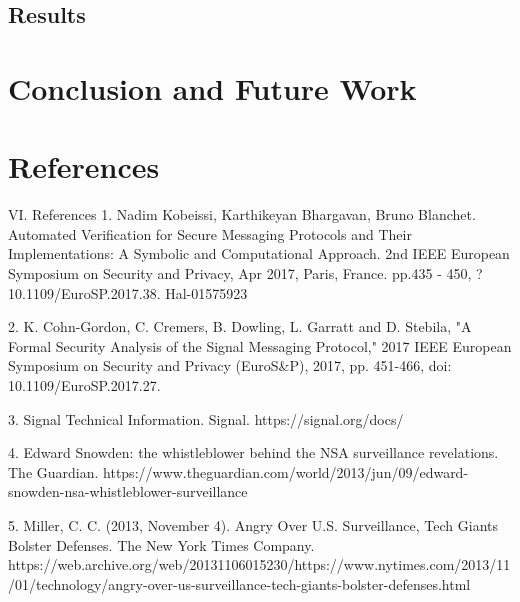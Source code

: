 \documentclass[12pt]{article}
\begin{document}
\subsection{Results}
\par %

\section{Conclusion and Future Work}
\par %





\newpage
\section{References}
VI. References
1. Nadim Kobeissi, Karthikeyan Bhargavan, Bruno Blanchet. Automated Verification for Secure Messaging Protocols and Their Implementations: A Symbolic and Computational Approach. 2nd IEEE European Symposium on Security and Privacy, Apr 2017, Paris, France. pp.435 - 450, ?10.1109/EuroSP.2017.38. Hal-01575923

2. K. Cohn-Gordon, C. Cremers, B. Dowling, L. Garratt and D. Stebila, "A Formal Security Analysis of the Signal Messaging Protocol," 2017 IEEE European Symposium on Security and Privacy (EuroS\&P), 2017, pp. 451-466, doi: 10.1109/EuroSP.2017.27.

3. Signal Technical Information. Signal. https://signal.org/docs/

4. Edward Snowden: the whistleblower behind the NSA surveillance revelations. The Guardian. https://www.theguardian.com/world/2013/jun/09/edward-snowden-nsa-whistleblower-surveillance

5. Miller, C. C. (2013, November 4). Angry Over U.S. Surveillance, Tech Giants Bolster Defenses. The New York Times Company. https://web.archive.org/web/20131106015230/https://www.nytimes.com/2013/11/01/technology/angry-over-us-surveillance-tech-giants-bolster-defenses.html
\end{document}
